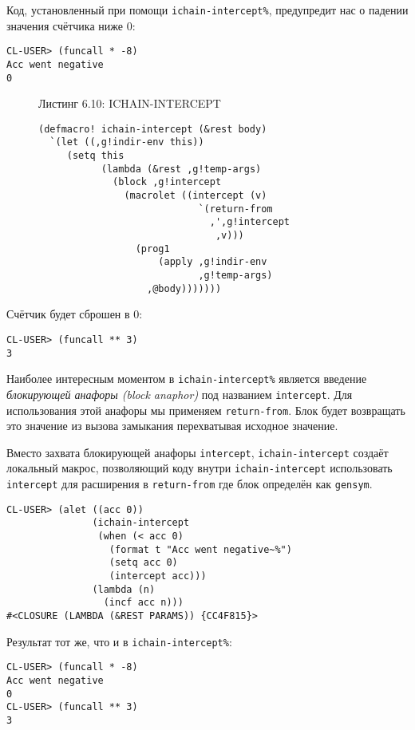 Код, установленный при помощи \verb"ichain-intercept%", предупредит нас о падении значения счётчика ниже 0:

\begin{verbatim}
CL-USER> (funcall * -8)
Acc went negative
0
\end{verbatim}

\begin{figure}Листинг 6.10: ICHAIN-INTERCEPT\label{listing_6.10}
\listbegin
\begin{verbatim}
(defmacro! ichain-intercept (&rest body)
  `(let ((,g!indir-env this))
     (setq this
           (lambda (&rest ,g!temp-args)
             (block ,g!intercept
               (macrolet ((intercept (v)
                            `(return-from
                              ,',g!intercept
                               ,v)))
                 (prog1
                     (apply ,g!indir-env
                            ,g!temp-args)
                   ,@body)))))))
\end{verbatim}
\listend
\end{figure}

Счётчик будет сброшен в 0:

\begin{verbatim}
CL-USER> (funcall ** 3)
3
\end{verbatim}

Наиболее интересным моментом в \verb"ichain-intercept%" является введение \emph{блокирующей анафоры (block anaphor)} под названием \verb"intercept". Для использования этой анафоры мы применяем \verb"return-from". Блок будет возвращать это значение из вызова замыкания перехватывая исходное значение.

Вместо захвата блокирующей анафоры \verb"intercept", \verb"ichain-intercept" создаёт локальный макрос, позволяющий коду внутри \verb"ichain-intercept" использовать \verb"intercept" для расширения в \verb"return-from" где блок определён как \verb"gensym".

\begin{verbatim}
CL-USER> (alet ((acc 0))
               (ichain-intercept
                (when (< acc 0)
                  (format t "Acc went negative~%")
                  (setq acc 0)
                  (intercept acc)))
               (lambda (n)
                 (incf acc n)))
#<CLOSURE (LAMBDA (&REST PARAMS)) {CC4F815}>
\end{verbatim}

Результат тот же, что и в \verb"ichain-intercept%":

\begin{verbatim}
CL-USER> (funcall * -8)
Acc went negative
0
CL-USER> (funcall ** 3)
3
\end{verbatim}

